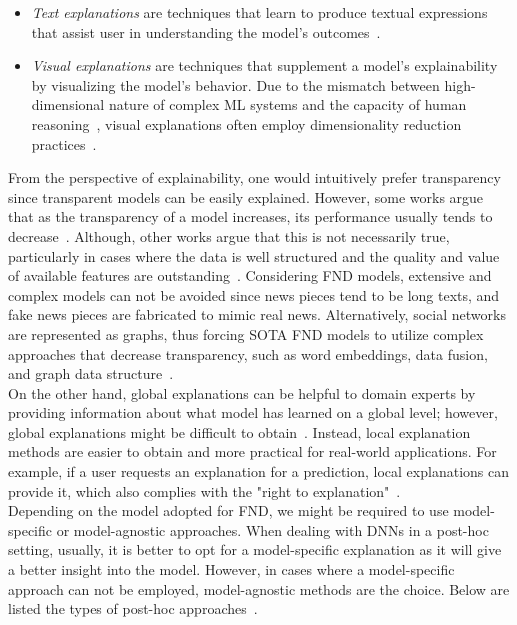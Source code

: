 \begin{itemize}
    \item \emph{Text explanations} are techniques that learn to produce textual expressions that assist user in understanding the model's outcomes~\parencite{TowardsExplainableNeuralSymbolic_Bennetot}.
    \item \emph{Visual explanations} are techniques that supplement a model's explainability by visualizing the model's behavior. Due to the mismatch between high-dimensional nature of  complex ML systems and the capacity of human reasoning~\parencite{HowTheMachineThinks_Burrell}, visual explanations often employ dimensionality reduction practices~\parencite{XAIConceptsTaxonomies_Arrieta}.
\end{itemize}
From the perspective of explainability, one would intuitively prefer transparency since transparent models
can be easily explained. However, some works argue that as the transparency of a model increases, its performance usually tends to decrease~\parencite{ExplaniableAIASurvey_Dosilovic}. Although, other works argue that this is not necessarily true, particularly in cases where the data is well structured and the quality and value of available features are outstanding~\parencite{StopExplainingBlackBoxmodels_Rudin}. Considering FND models, extensive and complex models can not be avoided since news pieces tend to be long texts, and fake news pieces are fabricated to mimic real news. Alternatively, social networks are represented as graphs, thus forcing SOTA FND models to utilize complex approaches that decrease transparency, such as word embeddings, data fusion, and graph data structure~\parencite{UPFD_Dataset_Shu}.\\
On the other hand, global explanations can be helpful to domain experts by providing information about what model has learned on a global level; however, global explanations might be difficult to obtain~\parencite{TheMythosOfModelInterpretability_Lipton}. Instead, local explanation methods are easier to obtain and more practical for real-world applications. For example, if a user requests an explanation for a prediction, local explanations can provide it, which also complies with the "right to explanation"~\parencite{EURegulationsOnDecisionMaking_Goodman}.\\
Depending on the model adopted for FND, we might be required to use model-specific or model-agnostic approaches. When dealing with DNNs in a post-hoc setting, usually, it is better to opt for a model-specific explanation as it will give a better insight into the model. However, in cases where a model-specific approach can not be employed, model-agnostic methods are the choice. Below are listed the types of post-hoc approaches~\parencite{XAIConceptsTaxonomies_Arrieta}.
